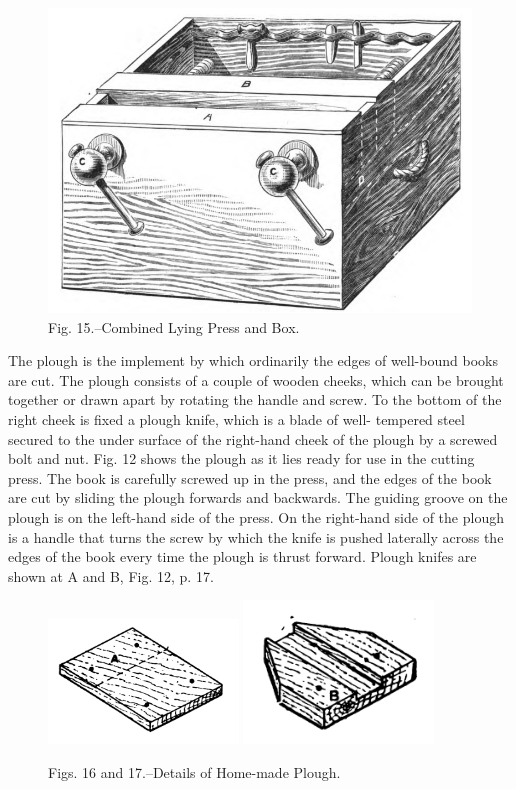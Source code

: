 \documentclass[twoside]{book}
\begin{document}
	\begin{figure}[h]
		\centering
		\includegraphics[width=\textwidth]{Figures/_015.png}
		\caption*{Fig. 15.--Combined Lying Press and Box.}
	\end{figure}

The plough is the implement by which ordinarily
the edges of well-bound books are cut. The plough
consists of a couple of wooden cheeks, which can be
brought together or drawn apart by rotating the
handle and screw. To the bottom of the right cheek
\pagebreak
is fixed a plough knife, which is a blade of well-
tempered steel secured to the under surface of the
right-hand cheek of the plough by a screwed bolt and nut.
Fig. 12 shows the plough as it lies ready for use in the
cutting press. The book is carefully screwed up in
the press, and the edges of the book are cut by
sliding the plough forwards and backwards. The
guiding groove on the plough is on the left-hand
side of the press. On the right-hand side of the
plough is a handle that turns the screw by which
the knife is pushed laterally across the edges of
the book every time the plough is thrust forward.
Plough knifes are shown at A and B, Fig. 12, p. 17.

	\begin{figure}[h]
		\centering
		\includegraphics[width=0.45\textwidth]{Figures/_016.png}
		\includegraphics[width=0.45\textwidth]{Figures/_017.png}
		\caption*{Figs. 16 and 17.--Details of Home-made Plough.}
	\end{figure}
\end{document}
